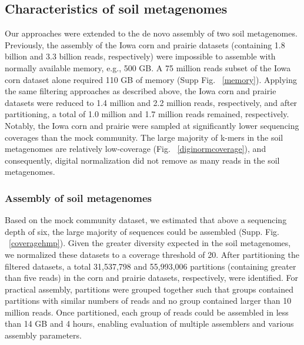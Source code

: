 \documentclass[11pt]{article} %
\begin{document}
\subsection{Characteristics of soil metagenomes}

Our approaches were extended to the de novo assembly of two soil metagenomes.  Previously, the assembly of the Iowa corn and prairie datasets (containing 1.8 billion and 3.3 billion reads, respectively) were impossible to assemble with normally available memory, e.g., 500 GB.   A 75 million reads subset of the Iowa corn dataset alone required 110 GB of memory (Supp Fig. ~\ref{memory}).  Applying the same filtering approaches as described above, the Iowa corn and prairie datasets were reduced to 1.4 million and 2.2 million reads, respectively, and after partitioning, a total of 1.0 million and 1.7 million reads remained, respectively.  Notably, the Iowa corn and prairie were sampled at significantly lower sequencing coverages than the mock community.  %
The large majority of k-mers in the soil metagenomes are relatively low-coverage (Fig. ~\ref{diginormcoverage}), and consequently, digital normalization did not remove as many reads in the soil metagenomes.

\subsubsection{Assembly of soil metagenomes}

Based on the mock community dataset, we estimated that above a sequencing depth of six, the large majority of sequences could be assembled (Supp. Fig. ~\ref{coveragehmp}).  Given the greater diversity expected in the soil metagenomes, we normalized these datasets to a coverage threshold of 20.  After partitioning the filtered datasets, a total 31,537,798 and 55,993,006 partitions (containing greater than five reads) in the corn and prairie datasets, respectively, were identified.  For practical assembly, partitions were grouped together such that groups contained partitions with similar numbers of reads and no group contained larger than 10 million reads.  Once partitioned, each group of reads could be assembled in less than 14 GB and 4 hours, enabling evaluation of multiple assemblers and various assembly parameters. 
\end{document}
